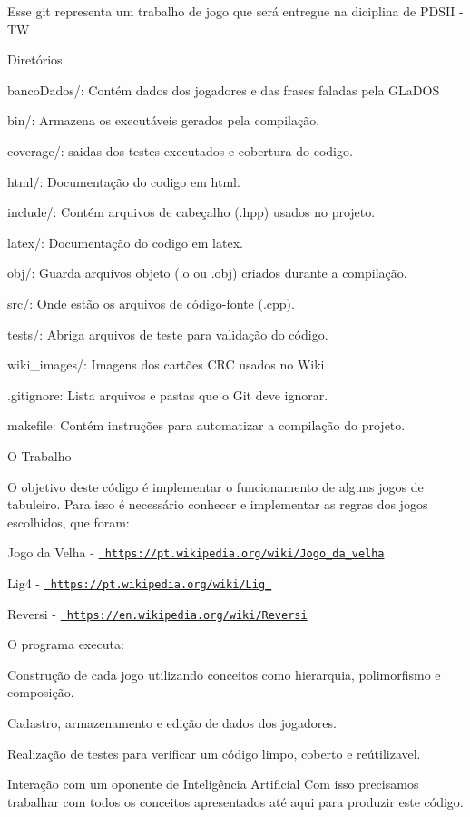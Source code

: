 Esse git representa um trabalho de jogo que será entregue na diciplina de PDSII -\/ TW

Diretórios
\begin{DoxyItemize}
\item 
\item banco\+Dados/\+: Contém dados dos jogadores e das frases faladas pela GLa\+DOS
\item bin/\+: Armazena os executáveis gerados pela compilação.
\item coverage/\+: saidas dos testes executados e cobertura do codigo.
\item html/\+: Documentação do codigo em html.
\item include/\+: Contém arquivos de cabeçalho (.hpp) usados no projeto.
\item latex/\+: Documentação do codigo em latex.
\item obj/\+: Guarda arquivos objeto (.o ou .obj) criados durante a compilação.
\item src/\+: Onde estão os arquivos de código-\/fonte (.cpp).
\item tests/\+: Abriga arquivos de teste para validação do código.
\item wiki\+\_\+images/\+: Imagens dos cartões CRC usados no Wiki
\item .gitignore\+: Lista arquivos e pastas que o Git deve ignorar.
\item makefile\+: Contém instruções para automatizar a compilação do projeto.
\end{DoxyItemize}

O Trabalho
\begin{DoxyItemize}
\item O objetivo deste código é implementar o funcionamento de alguns jogos de tabuleiro. Para isso é necessário conhecer e implementar as regras dos jogos escolhidos, que foram\+:
\item Jogo da Velha -\/ \href{https://pt.wikipedia.org/wiki/Jogo_da_velha}{\texttt{ https\+://pt.\+wikipedia.\+org/wiki/\+Jogo\+\_\+da\+\_\+velha}}
\item Lig4 -\/ \href{https://pt.wikipedia.org/wiki/Lig_4}{\texttt{ https\+://pt.\+wikipedia.\+org/wiki/\+Lig\+\_}}
\item Reversi -\/ \href{https://en.wikipedia.org/wiki/Reversi}{\texttt{ https\+://en.\+wikipedia.\+org/wiki/\+Reversi}}
\end{DoxyItemize}

O programa executa\+:
\begin{DoxyEnumerate}
\item Construção de cada jogo utilizando conceitos como hierarquia, polimorfismo e composição.
\item Cadastro, armazenamento e edição de dados dos jogadores.
\item Realização de testes para verificar um código limpo, coberto e reútilizavel.
\item Interação com um oponente de Inteligência Artificial Com isso precisamos trabalhar com todos os conceitos apresentados até aqui para produzir este código.
\end{DoxyEnumerate}

